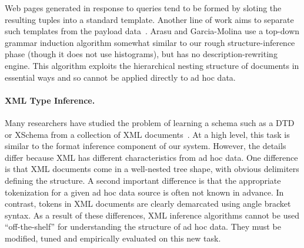 Web pages generated in response to queries tend to be formed by
sloting the resulting tuples into a standard template.  Another line
of work aims to separate such templates from the payload
data~\cite{arasu+:sigmod03,Cresenzi+:roadrunner}.  
Arasu and Garcia-Molina %
use a top-down grammar induction
algorithm somewhat similar to our rough structure-inference phase
(though it does not use histograms),
but has no description-rewriting engine.  
This algorithm exploits the hierarchical nesting
structure of \xml{} documents in essential ways
and so cannot be applied directly to ad hoc data.  








\paragraph*{XML Type Inference.}
Many researchers have studied the problem of learning
a schema such as a DTD or XSchema from a collection 
of XML
documents~\cite{bex+:dtd-inference,bex+:inferring-xml-schema,fernau:learning-xml,garofalakis+:xtract}.  
At a high level, this task is similar to the format inference component of our system.  
However, the details differ because XML has different characteristics
from ad hoc data.  One difference is that XML documents come in a well-nested tree 
shape, with obvious delimiters defining the structure.  
A second important difference is that the appropriate tokenization for
a given ad hoc data source is often not known in advance.  
In contrast,
tokens in XML documents are clearly demarcated using angle bracket syntax.
As a result of these differences,
XML inference algorithms cannot be used ``off-the-shelf'' for understanding
the structure of ad hoc data.  They must be modified, tuned and
empirically evaluated on this new task.

